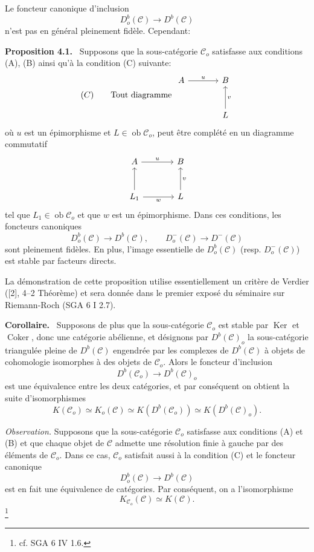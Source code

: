 \documentclass[11pt]{article}
\newenvironment{statement}[1]{\par\medskip\noindent\textbf{#1.}\ }{\par\medskip}
\providecommand{\Ker}{\operatorname{Ker}}
\providecommand{\Coker}{\operatorname{Coker}}
\providecommand{\Ob}{\operatorname{ob}}
\providecommand{\cC}{\mathcal C}
\providecommand{\Ker}{\operatorname{Ker}}
\providecommand{\Coker}{\operatorname{Coker}}
\providecommand{\Ker}{\operatorname{Ker}}
\providecommand{\Coker}{\operatorname{Coker}}
\providecommand{\Ob}{\operatorname{ob}}
\providecommand{\cC}{\mathcal C}
\providecommand{\Ob}{\operatorname{Ob}}
\begin{document}
Le foncteur canonique d'inclusion
\[
D_o^b(\cC)\longrightarrow D^b(\cC)
\]
n'est pas en général pleinement fidèle. Cependant:

\begin{statement}{Proposition 4.1}
Supposons que la sous-catégorie $\cC_o$ satisfasse aux conditions (A), (B) ainsi qu'à la condition (C) suivante:
\[
(C)\qquad
\text{Tout diagramme }
\begin{tikzcd}[column sep=large,row sep=large]
A \arrow[r,"u"]&B\\
&L \arrow[u,"v"']
\end{tikzcd}
\]
où $u$ est un épimorphisme et $L\in\Ob\cC_o$, peut être complété en un diagramme commutatif
\[
\begin{tikzcd}[column sep=large,row sep=large]
A \arrow[r,"u"]&B\\
L_1 \arrow[u] \arrow[r,"w"']&L \arrow[u,"v"']
\end{tikzcd}
\]
tel que $L_1\in\Ob\cC_o$ et que $w$ est un épimorphisme. Dans ces conditions, les foncteurs canoniques
\[
D_o^b(\cC)\longrightarrow D^b(\cC),\qquad
D_o^-(\cC)\longrightarrow D^-(\cC)
\]
sont pleinement fidèles. En plus, l'image essentielle de $D_o^b(\cC)$ (resp. $D_o^-(\cC)$) est stable par facteurs directs.
\end{statement}

La démonstration de cette proposition utilise essentiellement un critère de Verdier ([2], 4--2 Théorème) et sera donnée dans le premier exposé du séminaire sur Riemann-Roch (SGA 6 I 2.7).

\begin{statement}{Corollaire}
Supposons de plus que la sous-catégorie $\cC_o$ est stable par $\Ker$ et $\Coker$, donc une catégorie abélienne, et désignons par $D^b(\cC)_o$ la sous-catégorie triangulée pleine de $D^b(\cC)$ engendrée par les complexes de $D^b(\cC)$ à objets de cohomologie isomorphes à des objets de $\cC_o$. Alors le foncteur d'inclusion
\[
D^b(\cC_o)\longrightarrow D^b(\cC)_o
\]
est une équivalence entre les deux catégories, et par conséquent on obtient la suite d'isomorphismes
\[
K(\cC_o)\simeq K_o(\cC)\simeq K(D^b(\cC_o))\simeq K(D^b(\cC)_o).
\tag{*}
\]
\end{statement}

\emph{Observation.} Supposons que la sous-catégorie $\cC_o$ satisfasse aux conditions (A) et (B) et que chaque objet de $\cC$ admette une résolution finie à gauche par des éléments de $\cC_o$. Dans ce cas, $\cC_o$ satisfait aussi à la condition (C) et le foncteur canonique
\[
D_o^b(\cC)\longrightarrow D^b(\cC)
\]
est en fait une équivalence de catégories. Par conséquent, on a l'isomorphisme
\[
K_{\cC_o}(\cC)\simeq K(\cC).
\]
\footnote{cf. SGA 6 IV 1.6.}
\end{document}
